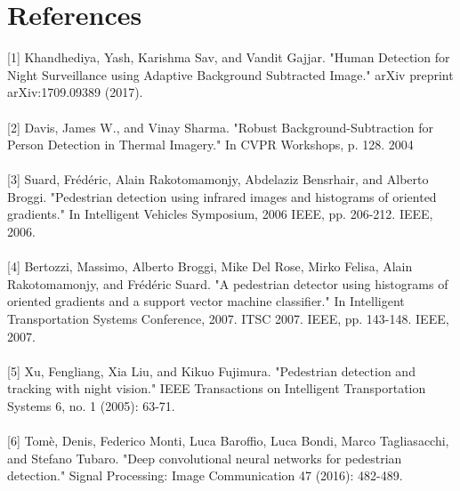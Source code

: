 \documentclass[•]{article}
\begin{document}
\section{References}
[1] Khandhediya, Yash, Karishma Sav, and Vandit Gajjar. "Human Detection for Night Surveillance using Adaptive Background Subtracted Image." arXiv preprint arXiv:1709.09389 (2017).\\
\\{[2]} Davis, James W., and Vinay Sharma. "Robust Background-Subtraction for Person Detection in Thermal Imagery." In CVPR Workshops, p. 128. 2004\\
\\ {[3]} Suard, Frédéric, Alain Rakotomamonjy, Abdelaziz Bensrhair, and Alberto Broggi. "Pedestrian detection using infrared images and histograms of oriented gradients." In Intelligent Vehicles Symposium, 2006 IEEE, pp. 206-212. IEEE, 2006.\\
\\ {[4]} Bertozzi, Massimo, Alberto Broggi, Mike Del Rose, Mirko Felisa, Alain Rakotomamonjy, and Frédéric Suard. "A pedestrian detector using histograms of oriented gradients and a support vector machine classifier." In Intelligent Transportation Systems Conference, 2007. ITSC 2007. IEEE, pp. 143-148. IEEE, 2007.\\
\\{[5]} Xu, Fengliang, Xia Liu, and Kikuo Fujimura. "Pedestrian detection and tracking with night vision." IEEE Transactions on Intelligent Transportation Systems 6, no. 1 (2005): 63-71.\\
\\{[6]} Tomè, Denis, Federico Monti, Luca Baroffio, Luca Bondi, Marco Tagliasacchi, and Stefano Tubaro. "Deep convolutional neural networks for pedestrian detection." Signal Processing: Image Communication 47 (2016): 482-489.
\end{document}
